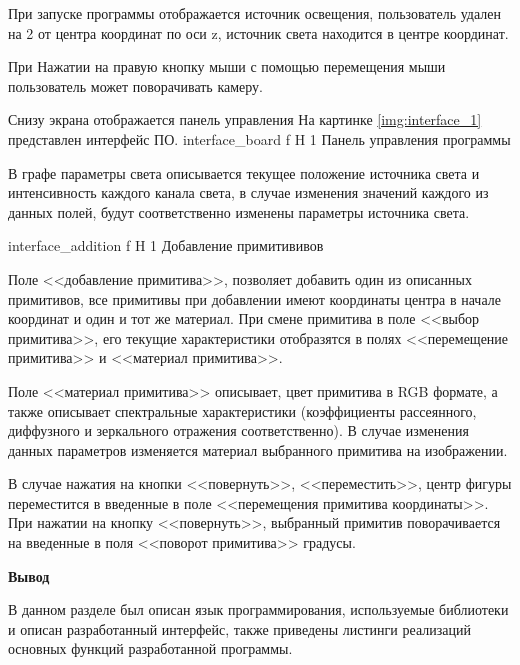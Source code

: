 При запуске программы отображается источник освещения, пользователь удален на 2 от центра координат по оси z, источник света находится в центре координат. 

При Нажатии на правую кнопку мыши с помощью перемещения мыши пользователь может поворачивать камеру.

Снизу экрана отображается панель управления 
На картинке \ref{img:interface_1} представлен интерфейс ПО.
{interface_board} %
{f} %
{H} %
{1\textwidth} %
{Панель управления программы} %

В графе параметры света описывается текущее положение источника света
и интенсивность каждого канала света, в случае изменения значений каждого из данных полей, будут соответственно изменены параметры источника света.

{interface_addition} %
{f} %
{H} %
{1\textwidth} %
{Добавление примитививов} %

Поле <<добавление примитива>>, позволяет добавить один из описанных примитивов, все примитивы при добавлении имеют координаты центра в начале координат и один и тот же материал.
При смене примитива в поле <<выбор примитива>>, его текущие характеристики отобразятся в полях <<перемещение примитива>>  и <<материал примитива>>.

Поле <<материал примитива>> описывает, цвет примитива в RGB формате,
а также описывает спектральные характеристики (коэффициенты рассеянного, диффузного и зеркального отражения соответственно).
В случае изменения данных параметров изменяется материал выбранного примитива на изображении.

В случае нажатия  на кнопки <<повернуть>>, <<переместить>>,
центр фигуры переместится в введенные в поле <<перемещения примитива координаты>>. При нажатии на кнопку <<повернуть>>, выбранный примитив
поворачивается на введенные в поля <<поворот примитива>> градусы.


\textbf{Вывод}

В данном разделе был описан язык программирования, используемые библиотеки и описан разработанный интерфейс, также приведены листинги реализаций основных функций разработанной программы.










